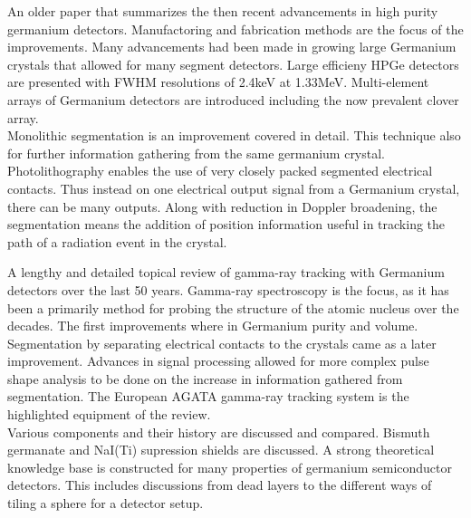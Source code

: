 \documentclass[12pt]{article}
\begin{document}
{\large\textbf{\cite{Sangsingkeow2003183}}}

An older paper that summarizes the then recent advancements in high purity germanium detectors. Manufactoring and fabrication methods are the focus of the improvements. Many advancements had been made in growing large Germanium crystals that allowed for many segment detectors. Large efficieny HPGe detectors are presented with FWHM resolutions of 2.4keV at 1.33MeV. Multi-element arrays of Germanium detectors are introduced including the now prevalent clover array.
\\
Monolithic segmentation is an improvement covered in detail. This technique also for further information gathering from the same germanium crystal. Photolithography enables the use of very closely packed segmented electrical contacts. Thus instead on one electrical output signal from a Germanium crystal, there can be many outputs. Along with reduction in Doppler broadening, the segmentation means the addition of position information useful in tracking the path of a radiation event in the crystal.
\\[20pt]


{\large\textbf{\cite{Eberth2008283}}}

A lengthy and detailed topical review of gamma-ray tracking with Germanium detectors over the last 50 years. Gamma-ray spectroscopy is the focus, as it has been a primarily method for probing the structure of the atomic nucleus over the decades. The first improvements where in Germanium purity and volume. Segmentation by separating electrical contacts to the crystals came as a later improvement. Advances in signal processing allowed for more complex pulse shape analysis to be done on the increase in information gathered from segmentation. The European AGATA gamma-ray tracking system is the highlighted equipment of the review.
\\
Various components and their history are discussed and compared. Bismuth germanate and NaI(Ti) supression shields are discussed. A strong theoretical knowledge base is constructed for many properties of germanium semiconductor detectors. This includes discussions from dead layers to the different ways of tiling a sphere for a detector setup.
\\[20pt]
\end{document}
